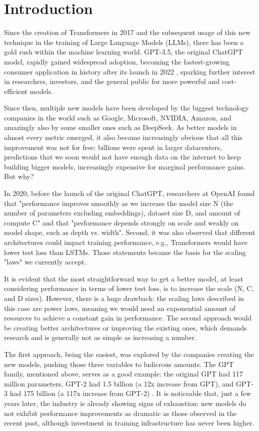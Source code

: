 \section{Introduction}

Since the creation of Transformers in 2017 \cite{Vaswani2017} and the subsequent usage of this new technique in the training of Large Language Models (LLMs), there has been a gold rush within the machine learning world. GPT-3.5, the original ChatGPT model, rapidly gained widespread adoption, becoming the fastest-growing consumer application in history after its launch in 2022 \cite{ChatGPTAdoption2022}, sparking further interest in researchers, investors, and the general public for more powerful and cost-efficient models. 

Since then, multiple new models have been developed by the biggest technology companies in the world such as Google, Microsoft, NVIDIA, Amazon, and amazingly also by some smaller ones such as DeepSeek. As better models in almost every metric emerged, it also became increasingly obvious that all this improvement was not for free: billions were spent in larger datacenters, predictions that we soon would not have enough data on the internet to keep building bigger models, increasingly expensive for marginal performance gains. But why?

In 2020, before the launch of the original ChatGPT, researchers at OpenAI \cite{Kaplan2020} found that "performance improves smoothly as we increase the model size N (the number of parameters excluding embeddings), dataset size D, and amount of compute C" and that "performance depends strongly on scale and weakly on model shape, such as depth vs. width". Second, it was also observed that different architectures could impact training performance, e.g., Transformers would have lower test loss than LSTMs. Those statements became the basis for the scaling "laws" we currently accept.

It is evident that the most straightforward way to get a better model, at least considering performance in terms of lower test loss, is to increase the scale (N, C, and D sizes). However, there is a huge drawback: the scaling laws described in this case are power laws, meaning we would need an exponential amount of resources to achieve a constant gain in performance. The second approach would be creating better architectures or improving the existing ones, which demands research and is generally not as simple as increasing a number.

The first approach, being the easiest, was explored by the companies creating the new models, pushing those three variables to ludicrous amounts. The GPT family, mentioned above, serves as a good example: the original GPT had 117 million parameters, GPT-2 had 1.5 billion (a 12x increase from GPT), and GPT-3 had 175 billion (a 117x increase from GPT-2) \cite{Brown2020} \cite{Radford2019} \cite{Radford2018}. It is noticeable that, just a few years later, the industry is already showing signs of exhaustion: new models do not exhibit performance improvements as dramatic as those observed in the recent past, although investment in training infrastructure has never been higher.

